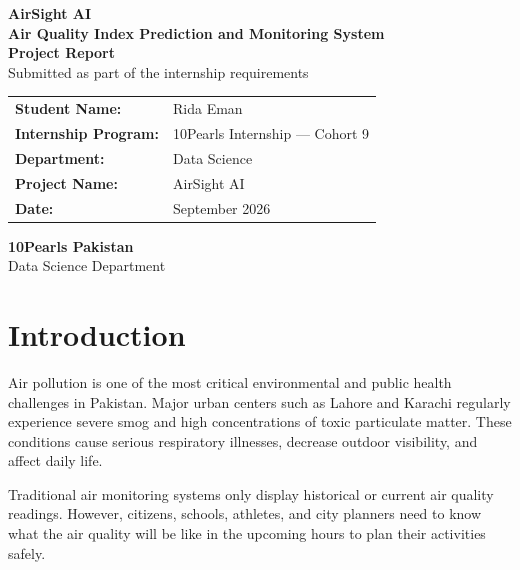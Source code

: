 \documentclass[12pt,a4paper]{article}
\begin{document}
\begin{titlepage}
    \centering
    \vspace*{1.5cm}
    
    {\fontsize{22pt}{26pt}\selectfont \textbf{AirSight AI}}\\[0.5cm]
    {\fontsize{15pt}{18pt}\selectfont \textbf{Air Quality Index Prediction and Monitoring System}}\\[2.5cm]
    
    \textbf{\large Project Report}\\[0.5cm]
    \large Submitted as part of the internship requirements\\[3cm]
    
    \begin{tabular}{ll}
        \textbf{Student Name:} & Rida Eman \\
        \textbf{Internship Program:} & 10Pearls Internship --- Cohort 9 \\
        \textbf{Department:} & Data Science \\
        \textbf{Project Name:} & AirSight AI \\
        \textbf{Date:} & September 2026 \\
    \end{tabular}
    
    \vfill
    {\large \textbf{10Pearls Pakistan}}\\[0.2cm]
    {\normalsize Data Science Department}
    \vspace*{1cm}
\end{titlepage}

\newpage

\section{Introduction}

Air pollution is one of the most critical environmental and public health challenges in Pakistan. Major urban centers such as Lahore and Karachi regularly experience severe smog and high concentrations of toxic particulate matter. These conditions cause serious respiratory illnesses, decrease outdoor visibility, and affect daily life. 

Traditional air monitoring systems only display historical or current air quality readings. However, citizens, schools, athletes, and city planners need to know what the air quality will be like in the upcoming hours to plan their activities safely.
\end{document}
